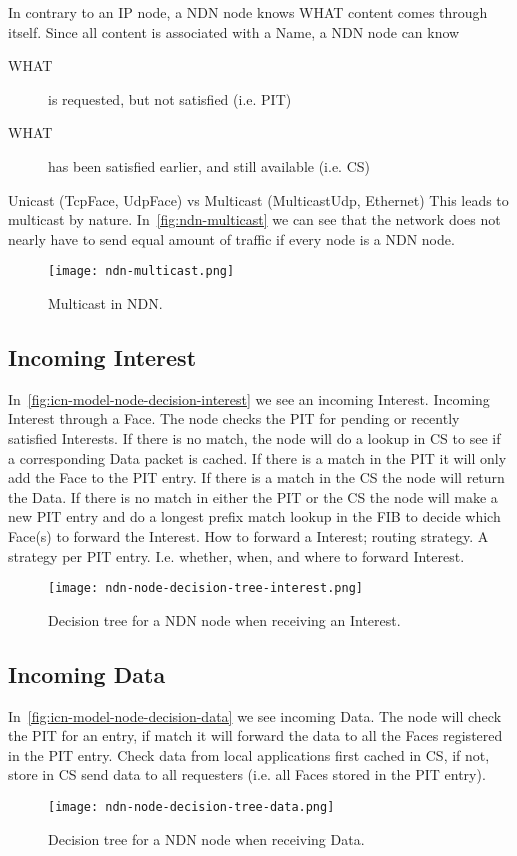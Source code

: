 In contrary to an \gls{IP} node, a \gls{NDN} node knows WHAT content comes through itself. 
Since all content is associated with a Name, a \gls{NDN} node can know 
\begin{description}
  \item[WHAT] is requested, but not satisfied (i.e. \gls{PIT})
  \item[WHAT] has been satisfied earlier, and still available (i.e. \gls{CS})
\end{description}

Unicast (TcpFace, UdpFace) vs Multicast (MulticastUdp, Ethernet)
This leads to multicast by nature.
In~\autoref{fig:ndn-multicast} we can see that the network does not nearly have to send equal amount of traffic if every node is a \gls{NDN} node.
\begin{figure}[H]
  \centering
  \texttt{[image: ndn-multicast.png]}
  \caption{Multicast in NDN.}
  \label{fig:ndn-multicast}
\end{figure}
 
\subsection{Incoming Interest}\label{incoming-interest}
In~\autoref{fig:icn-model-node-decision-interest} we see an incoming Interest.
Incoming Interest through a Face. The node checks the \gls{PIT} for pending or recently satisfied Interests. 
If there is no match, the node will do a lookup in \gls{CS} to see if a corresponding Data packet is cached. 
If there is a match in the \gls{PIT} it will only add the Face to the \gls{PIT} entry. If there is a match in the \gls{CS} the node will return the Data. 
If there is no match in either the \gls{PIT} or the \gls{CS} the node will make a new \gls{PIT} entry and do a longest prefix match lookup in the \gls{FIB} to decide which Face(s) to forward the Interest. 
How to forward a Interest; routing strategy. 
A strategy per \gls{PIT} entry. 
I.e. whether, when, and where to forward Interest.
\begin{figure}[H]
  \centering
  \texttt{[image: ndn-node-decision-tree-interest.png]}
  \caption{Decision tree for a \gls{NDN} node when receiving an Interest.}
  \label{fig:icn-model-node-decision-interest}
\end{figure}

\subsection{Incoming Data}
In~\autoref{fig:icn-model-node-decision-data} we see incoming Data.
The node will check  the \gls{PIT} for an entry, if match it will forward the data to all the Faces registered in the \gls{PIT} entry.
Check data from local applications first cached in \gls{CS}, if not, store in \gls{CS} send data to all requesters (i.e. all Faces stored in the \gls{PIT} entry).
\begin{figure}[H]
  \centering
  \texttt{[image: ndn-node-decision-tree-data.png]}
  \caption{Decision tree for a \gls{NDN} node when receiving Data.}
  \label{fig:icn-model-node-decision-data}
\end{figure}


